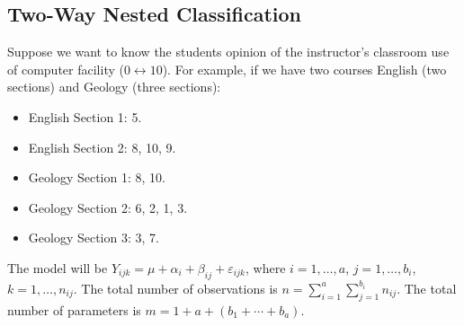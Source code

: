 \subsection*{Two-Way Nested Classification}
Suppose we want to know the students opinion of the instructor's
classroom use of computer facility ($ 0\leftrightarrow 10 $).
For example, if we have two courses English (two sections) and Geology (three sections):
\begin{itemize}
    \item English Section 1: 5.
    \item English Section 2: 8, 10, 9.
    \item Geology Section 1: 8, 10.
    \item Geology Section 2: 6, 2, 1, 3.
    \item Geology Section 3: 3, 7.
\end{itemize}
The model will be $ Y_{ijk}=\mu+\alpha_i+\beta_{ij}+\varepsilon_{ijk} $,
where $ i=1,\ldots,a $, $ j=1,\ldots,b_i $, $ k=1,\ldots,n_{ij} $.
The total number of observations is $ n=\sum_{i=1}^{a}\sum_{j=1}^{b_i}n_{ij} $.
The total number of parameters is $ m=1+a+(b_1+\cdots+b_a) $.
